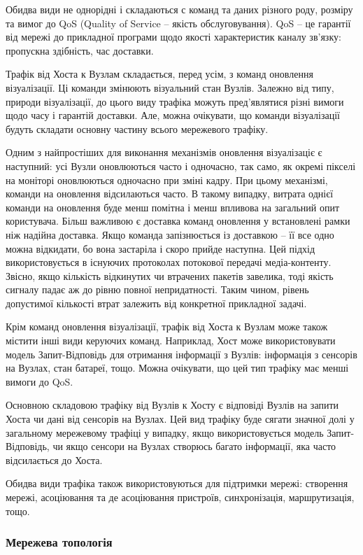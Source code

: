 \documentclass[a4paper,ukrainian,utf8,nocolumnsxix,floatsection]{eskdtext}
\renewcommand\paragraph{\subsubsection}
\begin{document}
Обидва види не однорідні і складаються с команд та даних різного роду, розміру та вимог до QoS (Quality of Service – якість обслуговування). QoS – це гарантії від мережі до прикладної програми щодо якості характеристик каналу зв’язку: пропускна здібність, час доставки.

Трафік від Хоста к Вузлам складається, перед усім, з команд оновлення візуалізації. Ці команди змінюють візуальний стан Вузлів. Залежно від типу, природи візуалізації, до цього виду трафіка можуть пред’являтися різні вимоги щодо часу і гарантій доставки. Але, можна очікувати, що команди візуалізації будуть складати основну частину всього мережевого трафіку.

Одним з найпростіших для виконання механізмів оновлення візуалізаціє є наступний: усі Вузли оновлюються часто і одночасно, так само, як окремі пікселі на моніторі оновлюються одночасно при зміні кадру. При цьому механізмі, команди на оновлення відсилаються часто. В такому випадку, витрата однієї команди на оновлення буде менш помітна і менш впливова на загальний опит користувача. Більш важливою є доставка  команд оновлення у встановлені рамки ніж надійна доставка. Якщо команда запізнюється із доставкою – її все одно можна відкидати, бо вона застаріла і скоро прийде наступна. Цей підхід використовується в існуючих протоколах потокової передачі медіа-контенту. Звісно, якщо кількість відкинутих чи втрачених пакетів завелика, тоді якість сигналу падає аж до рівню повної непридатності. Таким чином, рівень допустимої кількості втрат залежить від конкретної прикладної задачі.

Крім команд оновлення візуалізації, трафік від Хоста к Вузлам може також містити інші види керуючих команд. Наприклад, Хост може використовувати модель Запит-Відповідь для отримання інформації з Вузлів: інформація з сенсорів на Вузлах, стан батареї, тощо. Можна очікувати, що цей тип трафіку має менші вимоги до QoS.

Основною складовою трафіку від Вузлів к Хосту є відповіді Вузлів на запити Хоста чи дані від сенсорів на Вузлах. Цей вид трафіку буде сягати значної долі у загальному мережевому трафіці у випадку, якщо використовується модель Запит-Відповідь, чи якщо сенсори на Вузлах створюсь багато інформації, яка часто відсилається до Хоста.

Обидва види трафіка також використовуються для підтримки мережі: створення мережі, асоціювання та де асоціювання пристроїв, синхронізація, маршрутизація, тощо.

\paragraph{Мережева топологія}
\end{document}
